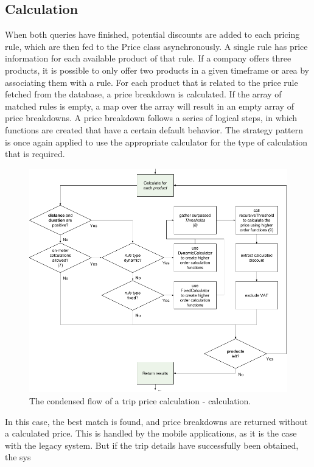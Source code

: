 \subsection{Calculation}
When both queries have finished, potential discounts are added to each pricing rule, which are then fed to the Price class asynchronously. A single rule has price information for each available product of that rule. If a company offers three products, it is possible to only offer two products in a given timeframe or area by associating them with a rule. For each product that is related to the price rule fetched from the database, a price breakdown is calculated. If the array of matched rules is empty, a map over the array will result in an empty array of price breakdowns. A price breakdown follows a series of logical steps, in which functions are created that have a certain default behavior. The strategy pattern is once again applied to use the appropriate calculator for the type of calculation that is required.

\begin{figure}[H]
	\centering
	\includegraphics[width=1\textwidth]{Calculation}
	\caption[Calculation]{The condensed flow of a trip price calculation - calculation.}
	\label{fig:Calculation}
\end{figure}

In this case, the best match is found, and price breakdowns are returned without a calculated price. This is handled by the mobile applications, as it is the case with the legacy system. But if the trip details have successfully been obtained, the sys

